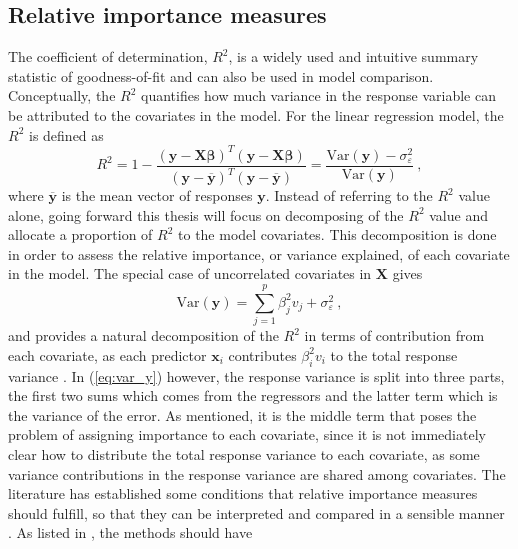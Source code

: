 \subsection{Relative importance measures}
\label{sec:rel_imp}
The coefficient of determination, $R^2$, is a widely used and intuitive summary statistic of goodness-of-fit and can also be used in model comparison. 
Conceptually, the $R^2$ quantifies how much variance in the response variable can be attributed to the covariates in the model. 
For the linear regression model, the $R^2$ is defined as
\begin{equation}
    \label{eq:R2}
    R^2 = 1 - \frac{(\mathbf{y}-\mathbf{X}\boldsymbol{\beta})^T(\mathbf{y}-\mathbf{X}\boldsymbol{\beta})}{(\mathbf{y}-\overline{\mathbf{y}})^T(\mathbf{y}-\overline{\mathbf{y}})} = \frac{\text{Var}(\mathbf{y}) - \sigma^2_{\varepsilon}}{\text{Var}(\mathbf{y})} \ ,
\end{equation}
where $\overline{\mathbf{y}}$ is the mean vector of responses $\mathbf{y}$. 
Instead of referring to the $R^2$ value alone, going forward this thesis will focus on decomposing of the $R^2$ value and allocate a proportion of $R^2$ to the model covariates. 
This decomposition is done in order to assess the relative importance, or variance explained, of each covariate in the model.
The special case of uncorrelated covariates in $\mathbf{X}$ gives 
\begin{equation}
    \label{eq:var_y_uncorrelated}
    \text{Var}(\mathbf{y}) = \sum_{j=1}^p\beta_j^2v_j + \sigma_{\varepsilon}^2 \ ,
\end{equation}
and provides a natural decomposition of the $R^2$ in terms of contribution from each covariate, as each predictor $\mathbf{x}_i$ contributes $\beta_i^2v_i$ to the total response variance \citep{gromping_relaimpo}.
In (\ref{eq:var_y}) however, the response variance is split into three parts, the first two sums which comes from the regressors and the latter term which is the variance of the error. 
As mentioned, it is the middle term that poses the problem of assigning importance to each covariate, since it is not immediately clear how to distribute the total response variance to each covariate, as some variance contributions in the response variance are shared among covariates. The literature has established some conditions that relative importance measures should fulfill, so that they can be interpreted and compared in a sensible manner \citep{gromping_relaimpo}. As listed in \citet{gromping_relaimpo}, the methods should have
